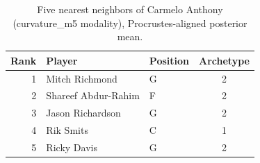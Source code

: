 \begin{table}[htbp]
  \centering\small
  \begin{tabular}{rllc}
    \toprule
    Rank & Player & Position & Archetype \\
    \midrule
    1 & Mitch Richmond & G & 2 \\
    2 & Shareef Abdur-Rahim & F & 2 \\
    3 & Jason Richardson & G & 2 \\
    4 & Rik Smits & C & 1 \\
    5 & Ricky Davis & G & 2 \\
    \bottomrule
  \end{tabular}
  \caption{Five nearest neighbors of Carmelo Anthony (curvature_m5 modality), Procrustes-aligned posterior mean.}
  \label{tab:Carmelo_Anthony_neighbors_curvature_m5}
\end{table}

